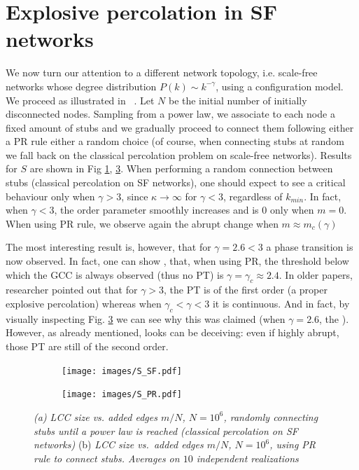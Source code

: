 \section{Explosive percolation in SF networks}
We now turn our attention to a different network topology, i.e. scale-free networks whose degree distribution $P(k) \sim k^{-\gamma}$, using a configuration model. We proceed as illustrated in ~\cite{Radicchi}. Let $N$ be the initial number of initially disconnected nodes. Sampling from a power law, we associate to each node a fixed amount of stubs and we gradually proceed to connect them following either a PR rule either a random choice (of course, when connecting stubs at random we fall back on the classical percolation problem on scale-free networks). Results for $S$ are shown in Fig \ref{fig::RGSF}, \ref{fig::PRSF}. When performing a random connection between stubs (classical percolation on SF networks), one should expect to see a critical behaviour only when $\gamma > 3$, since $\kappa \to \infty$ for $\gamma < 3$, regardless of $k_{min}$. In fact, when $\gamma < 3$, the order parameter smoothly increases and is $0$ only when $m = 0$. When using PR rule, we observe again the abrupt change when $m \approx m_c(\gamma)$ 

The most interesting result is, however, that for $\gamma = 2.6 < 3$ a phase transition is now observed. In fact, one can show \cite{Radicchi}, \cite{Cho_2009} that, when using PR, the threshold below which the GCC is always observed (thus no PT) is $\gamma = \gamma_c \approx 2.4$. In older papers, researcher pointed out that for $\gamma > 3$, the PT is of the first order (a proper explosive percolation) whereas when $\gamma_c < \gamma < 3$ it is continuous. And in fact, by visually inspecting Fig. \ref{fig::PRSF} we can see why this was claimed (when $\gamma = 2.6$, the  ). However, as already mentioned, looks can be deceiving: even if highly abrupt, those PT are still of the second order. 

\begin{figure}
	\centering
	\begin{subfigure}[t]{0.48\linewidth}
		\texttt{[image: images/S\_SF.pdf]}
		\vspace{-28pt}
		\caption{}
		\label{fig::RGSF}
	\end{subfigure}
	\hspace{3pt}
	\begin{subfigure}[t]{0.48\linewidth}
		\texttt{[image: images/S\_PR.pdf]}
		\vspace{-28pt}
		\caption{} 
		\label{fig::PRSF}
	\end{subfigure}
	\vspace{-10pt}
	\caption{\textit{(a) LCC size vs. added edges $m/N$, $N = 10^6$, randomly connecting stubs until a power law is reached (classical percolation on SF networks)} (b) \textit{LCC size vs.\ added edges $m/N$, $N = 10^6$, using PR rule to connect stubs. Averages on $10$ independent realizations}}
\end{figure}


